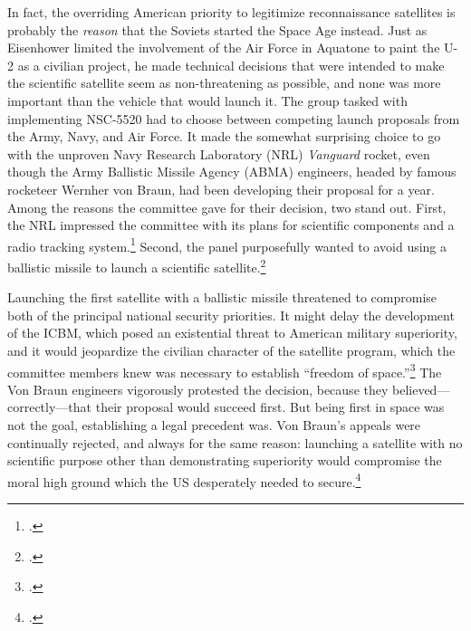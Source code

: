 \documentclass{memoir}
\begin{document}
In fact, the overriding American priority to legitimize reconnaissance satellites is probably the \emph{reason} that the Soviets started the Space Age instead. Just as Eisenhower limited the involvement of the Air Force in Aquatone to paint the U-2 as a civilian project, he made technical decisions that were intended to make the scientific satellite seem as non-threatening as possible, and none was more important than the vehicle that would launch it. The group tasked with implementing NSC-5520 had to choose between competing launch proposals from the Army, Navy, and Air Force. It made the somewhat surprising choice to go with the unproven Navy Research Laboratory (NRL) \emph{Vanguard} rocket, even though the Army Ballistic Missile Agency (ABMA) engineers, headed by famous rocketeer Wernher von Braun, had been developing their proposal for a year. Among the reasons the committee gave for their decision, two stand out. First, the NRL impressed the committee with its plans for scientific components and a radio tracking system.\footcite[p.~122]{mcdougall_heavens_1985} Second, the panel purposefully wanted to avoid using a ballistic missile to launch a scientific satellite.\footcite[p.~129. Though the NRL is run by the Navy, it functions like a civilian scientific operation. Everything that I have read about this decision seems to take it for granted that despite the Navy involement, the NRL proposal would be seen as a civilian project. This makes sense to me, especially when you consider that it was competiting with the same agency that was building nuclear delivery systems.]{day_eye_2015}

Launching the first satellite with a ballistic missile threatened to compromise both of the principal national security priorities. It might delay the development of the ICBM, which posed an existential threat to American military superiority, and it would jeopardize the civilian character of the satellite program, which the committee members knew was necessary to establish ``freedom of space.''\footcite[p.~122]{mcdougall_heavens_1985} The Von Braun engineers vigorously protested the decision, because they believed---correctly---that their proposal would succeed first. But being first in space was not the goal, establishing a legal precedent was. Von Braun's appeals were continually rejected, and always for the same reason: launching a satellite with no scientific purpose other than demonstrating superiority would compromise the moral high ground which the US desperately needed to secure.\footcite[p.~131]{day_eye_2015}
\end{document}
